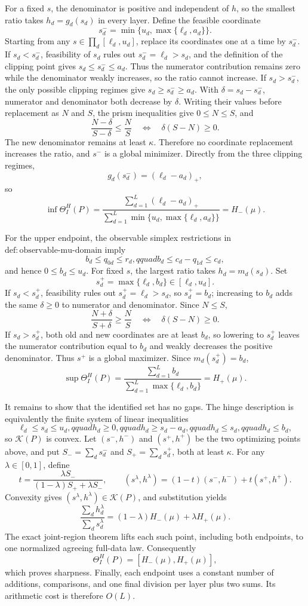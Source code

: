 For a fixed \(s\), the denominator is positive and independent of \(h\), so the smallest ratio takes \(h_d=g_d(s_d)\) in every layer.  Define the feasible coordinate
\[s_d^- =\min\{u_d,\max\{\ell_d,a_d\}\}.\]
Starting from any \(s\in\prod_d[\ell_d,u_d]\), replace its coordinates one at a time by \(s_d^-\).  If \(s_d<s_d^-\), feasibility of \(s_d\) rules out \(s_d^-=\ell_d>s_d\), and the definition of the clipping point gives \(s_d\le s_d^-\le a_d\).  Thus the numerator contribution remains zero while the denominator weakly increases, so the ratio cannot increase.  If \(s_d>s_d^-\), the only possible clipping regimes give \(s_d\ge s_d^-\ge a_d\).  With \(\delta=s_d-s_d^-\), numerator and denominator both decrease by \(\delta\).  Writing their values before replacement as \(N\) and \(S\), the prism inequalities give \(0\le N\le S\), and
\[\frac{N-\delta}{S-\delta}\le\frac NS
\quad\Longleftrightarrow\quad
\delta(S-N)\ge0.\]
The new denominator remains at least \(\kappa\).  Therefore no coordinate replacement increases the ratio, and \(s^-\) is a global minimizer.  Directly from the three clipping regimes,
\[g_d(s_d^-)=(\ell_d-a_d)_+,\]
so
\[\inf\Theta_I^H(P)=
\frac{\sum_{d=1}^{L}(\ell_d-a_d)_+}
{\sum_{d=1}^{L}\min\{u_d,\max\{\ell_d,a_d\}\}}=H_-(\mu).\]

For the upper endpoint, the observable simplex restrictions in \(\mathrm{def{:}observable\mbox{-}mu\mbox{-}domain}\) imply
\[b_d\le q_{0d}\le r_d,qquad b_d\le c_d-q_{1d}\le c_d,\]
and hence \(0\le b_d\le u_d\).  For fixed \(s\), the largest ratio takes \(h_d=m_d(s_d)\).  Set
\[s_d^+=\max\{\ell_d,b_d\}\in[\ell_d,u_d].\]
If \(s_d<s_d^+\), feasibility rules out \(s_d^+=\ell_d>s_d\), so \(s_d^+=b_d\); increasing to \(b_d\) adds the same \(\delta\ge0\) to numerator and denominator.  Since \(N\le S\),
\[\frac{N+\delta}{S+\delta}\ge\frac NS
\quad\Longleftrightarrow\quad
\delta(S-N)\ge0.\]
If \(s_d>s_d^+\), both old and new coordinates are at least \(b_d\), so lowering to \(s_d^+\) leaves the numerator contribution equal to \(b_d\) and weakly decreases the positive denominator.  Thus \(s^+\) is a global maximizer.  Since \(m_d(s_d^+)=b_d\),
\[\sup\Theta_I^H(P)=
\frac{\sum_{d=1}^{L}b_d}
{\sum_{d=1}^{L}\max\{\ell_d,b_d\}}=H_+(\mu).\]

It remains to show that the identified set has no gaps.  The hinge description is equivalently the finite system of linear inequalities
\[\ell_d\le s_d\le u_d,qquad h_d\ge0,qquad h_d\ge s_d-a_d,qquad
h_d\le s_d,qquad h_d\le b_d,\]
so \(\mathcal K(P)\) is convex.  Let \((s^-,h^-)\) and \((s^+,h^+)\) be the two optimizing points above, and put \(S_-=\sum_ds_d^-\) and \(S_+=\sum_ds_d^+\), both at least \(\kappa\).  For any \(\lambda\in[0,1]\), define
\[t=\frac{\lambda S_-}{(1-\lambda)S_++\lambda S_-},\qquad
(s^{\lambda},h^{\lambda})=(1-t)(s^-,h^-)+t(s^+,h^+).\]
Convexity gives \((s^{\lambda},h^{\lambda})\in\mathcal K(P)\), and substitution yields
\[\frac{\sum_dh_d^{\lambda}}{\sum_ds_d^{\lambda}}
=(1-\lambda)H_-(\mu)+\lambda H_+(\mu).\]
The exact joint-region theorem lifts each such point, including both endpoints, to one normalized agreeing full-data law.  Consequently
\[\Theta_I^H(P)=[H_-(\mu),H_+(\mu)],\]
which proves sharpness.  Finally, each endpoint uses a constant number of additions, comparisons, and one final division per layer plus two sums.  Its arithmetic cost is therefore \(O(L)\).
